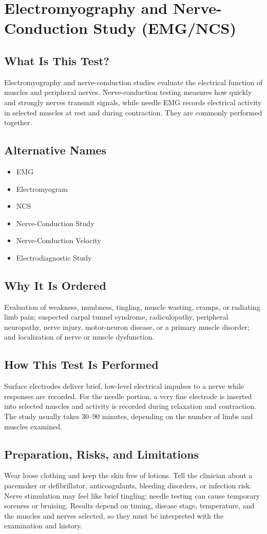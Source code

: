\chapter{Electromyography and Nerve-Conduction Study (EMG/NCS)}

\section*{What Is This Test?}
Electromyography and nerve-conduction studies evaluate the electrical function of muscles and peripheral nerves. Nerve-conduction testing measures how quickly and strongly nerves transmit signals, while needle EMG records electrical activity in selected muscles at rest and during contraction. They are commonly performed together.

\section*{Alternative Names}
\begin{itemize}
  \item EMG
  \item Electromyogram
  \item NCS
  \item Nerve-Conduction Study
  \item Nerve-Conduction Velocity
  \item Electrodiagnostic Study
\end{itemize}
\section*{Why It Is Ordered}
Evaluation of weakness, numbness, tingling, muscle wasting, cramps, or radiating limb pain; suspected carpal tunnel syndrome, radiculopathy, peripheral neuropathy, nerve injury, motor-neuron disease, or a primary muscle disorder; and localization of nerve or muscle dysfunction.

\section*{How This Test Is Performed}
Surface electrodes deliver brief, low-level electrical impulses to a nerve while responses are recorded. For the needle portion, a very fine electrode is inserted into selected muscles and activity is recorded during relaxation and contraction. The study usually takes 30--90 minutes, depending on the number of limbs and muscles examined.

\section*{Preparation, Risks, and Limitations}
Wear loose clothing and keep the skin free of lotions. Tell the clinician about a pacemaker or defibrillator, anticoagulants, bleeding disorders, or infection risk. Nerve stimulation may feel like brief tingling; needle testing can cause temporary soreness or bruising. Results depend on timing, disease stage, temperature, and the muscles and nerves selected, so they must be interpreted with the examination and history.

